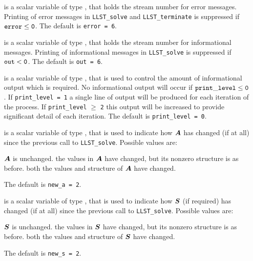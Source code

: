 \documentclass{galahad}
\newcommand{\packagename}{LLST}
\begin{document}
\begin{description}
 is a scalar variable of type \integer, that holds the
stream number for error messages.
Printing of error messages in
{\tt \packagename\_solve} and {\tt \packagename\_terminate}
is suppressed if ${\tt error} \leq {\tt 0}$.
The default is {\tt error = 6}.

 is a scalar variable of type \integer, that holds the
stream number for informational messages.
Printing of informational messages in
{\tt \packagename\_solve} is suppressed if ${\tt out} < {\tt 0}$.
The default is {\tt out = 6}.

 is a scalar variable of type \integer,
that is used
to control the amount of informational output which is required. No
informational output will occur if ${\tt print\_level} \leq {\tt 0}$. If
{\tt print\_level = 1} a single line of output will be produced for each
iteration of the process. If {\tt print\_level} $\geq$ {\tt 2} this output
will be increased to provide significant detail of each iteration.
The default is {\tt print\_level = 0}.


 is a scalar variable of type \integer, that is used
to indicate how ${\bm{A}}$ has changed (if at all) since the previous
call to {\tt \packagename\_solve}. Possible values are:
\begin{description}
 ${\bm{A}}$ is unchanged.
 the values in ${\bm{A}}$ have changed, but its nonzero structure
is as before.
 both the values and structure of ${\bm{A}}$ have changed.
\end{description}
The default is {\tt new\_a = 2}.

 is a scalar variable of type \integer, that is used
to indicate how ${\bm{S}}$ (if required) has changed (if at all) since the previous
call to {\tt \packagename\_solve}. Possible values are:
\begin{description}
 ${\bm{S}}$ is unchanged.
 the values in ${\bm{S}}$ have changed, but its nonzero structure
is as before.
 both the values and structure of ${\bm{S}}$ have changed.
\end{description}
The default is {\tt new\_s = 2}.


\end{description}
\end{document}
